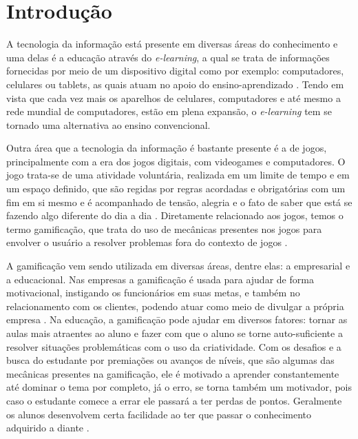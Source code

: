 
\chapter{Introdução}\label{intro}
A tecnologia da informação está presente em diversas áreas do conhecimento e uma delas é a educação através do \textit{e-learning}, a qual se trata de informações fornecidas por meio de um dispositivo digital como por exemplo: computadores, celulares ou tablets, as quais atuam no apoio do ensino-aprendizado \cite{clark2016learning}. Tendo em vista que cada vez mais os aparelhos de celulares, computadores e até mesmo a rede mundial de computadores, estão em plena expansão, o \textit{e-learning} tem se tornado uma alternativa ao ensino convencional.

Outra área que a tecnologia da informação é bastante presente é a de  jogos, principalmente com a era dos jogos digitais, com videogames e computadores. O jogo trata-se de uma atividade voluntária, realizada em um limite de tempo e em um espaço definido, que são regidas por regras acordadas e obrigatórias com um fim em si mesmo e é acompanhado de tensão, alegria e o fato de saber que está se fazendo algo diferente do dia a dia \cite{huizinga1971homo}. Diretamente relacionado aos jogos, temos o termo gamificação, que trata do uso de mecânicas presentes nos jogos para envolver o usuário a resolver problemas fora do contexto de jogos \cite{zichermann2011gamification}. 

A gamificação vem sendo utilizada em diversas áreas, dentre elas: a empresarial e a educacional. Nas empresas a gamificação é usada para ajudar de forma motivacional, instigando os funcionários em suas metas, e também no relacionamento com os clientes, podendo atuar como meio de divulgar a própria empresa \cite{da2013investigando}. Na educação, a gamificaçāo pode ajudar em diversos fatores: tornar as aulas mais atraentes ao aluno e fazer com que o aluno se torne auto-suficiente a resolver situações problemáticas com o uso da criatividade. Com os desafios e a busca do estudante por premiações ou avanços de níveis, que são algumas das mecânicas presentes na gamificação, ele é motivado a aprender constantemente até dominar o tema por completo, já o erro, se torna também um motivador, pois caso o estudante comece a errar ele passará a ter perdas de pontos. Geralmente os alunos desenvolvem certa facilidade ao ter que passar o conhecimento adquirido a diante \cite{da2014gamificaccao}.

